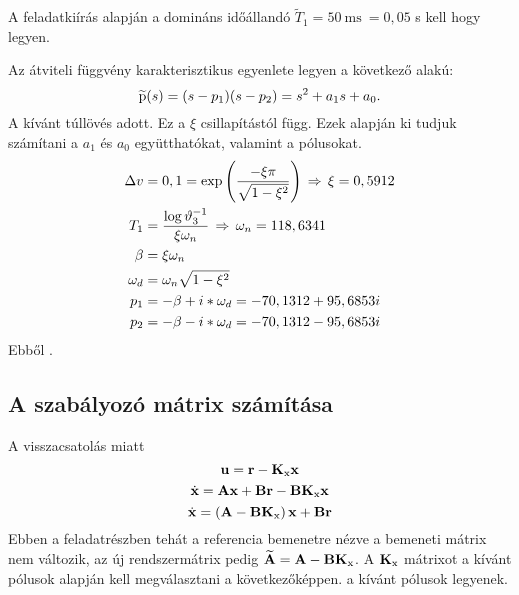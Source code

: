 A feladatkiírás alapján a domináns időállandó $\widetilde{T}_1=50~\text{ms}~=0,05$ s
kell hogy legyen.

Az átviteli függvény karakterisztikus egyenlete legyen a következő alakú:
\begin{equation}
	\widetilde{\mathrm{p}}(s) = (s-p_1)(s-p_2) = s^2 + a_1 s + a_0.
\end{equation}
A kívánt túllövés adott. Ez a $\xi$ csillapítástól függ. Ezek alapján ki tudjuk számítani a
$a_1$ és $a_0$ együtthatókat, valamint a pólusokat.
\begin{align}
	\Delta v &= 0,1 = \exp\left(\frac{-\xi\pi}{\sqrt{1-\xi^2} }\right)\,\Rightarrow\,\xi=0,5912\\
	T_1 &= \frac{\log\vartheta_3^{-1}}{\xi \omega_n}\,\Rightarrow\,\omega_n=118,6341\\
	\beta &= \xi\omega_n\\
	\omega_d &= \omega_n\sqrt{1-\xi^2}\\
	p_1 &= -\beta + i*\omega_d = -70,1312 +95,6853i\\
	p_2 &= -\beta - i*\omega_d = -70,1312 -95,6853i
\end{align}
%
Ebből .


\subsection{A szabályozó mátrix számítása}


A visszacsatolás miatt
\begin{equation}
	\boldsymbol{\mathrm{u}} = \boldsymbol{\mathrm{r}} - \boldsymbol{\mathrm{K}}_\text{x}\boldsymbol{\mathrm{x}}
\end{equation}
\begin{equation}
	\dot{\boldsymbol{\mathrm{x}}} = \boldsymbol{\mathrm{A}}\boldsymbol{\mathrm{x}} + \boldsymbol{\mathrm{B}}\boldsymbol{\mathrm{r}} - \boldsymbol{\mathrm{B}}\boldsymbol{\mathrm{K}}_\text{x}\boldsymbol{\mathrm{x}}
\end{equation}
\begin{equation}
	\dot{\boldsymbol{\mathrm{x}}} = \left(\boldsymbol{\mathrm{A}}-\boldsymbol{\mathrm{B}}\boldsymbol{\mathrm{K}}_\text{x}\right)\boldsymbol{\mathrm{x}} + \boldsymbol{\mathrm{B}}\boldsymbol{\mathrm{r}}
\end{equation}
Ebben a feladatrészben  tehát a referencia bemenetre nézve
a bemeneti mátrix nem változik, az új rendszermátrix pedig $\widetilde{\boldsymbol{\mathrm{A}}} = \boldsymbol{\mathrm{A}}-\boldsymbol{\mathrm{B}}\boldsymbol{\mathrm{K}}_\text{x}$.
A $\boldsymbol{\mathrm{K}}_\text{x}$ mátrixot a kívánt pólusok alapján kell megválasztani a következőképpen.
a kívánt pólusok legyenek.

